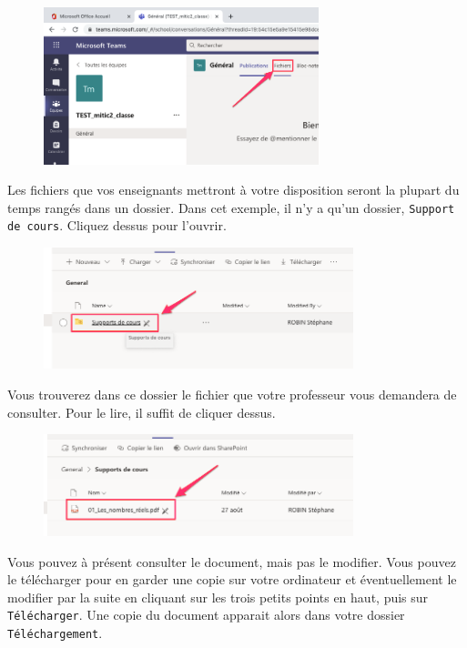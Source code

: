 \begin{figure}[H]
	\includegraphics[width=8cm]{./images/teams/accueil_classe_crop}
	\centering
\end{figure}

Les fichiers que vos enseignants mettront à votre disposition seront la plupart du temps rangés dans un dossier. Dans cet exemple, il n'y a qu'un dossier, \texttt{Support de cours}. Cliquez dessus pour l'ouvrir.

\begin{figure}[H]
	\includegraphics[width=9cm]{./images/teams/ouvrir_dossier_crop}
	\centering
\end{figure}

Vous trouverez dans ce dossier le fichier que votre professeur vous demandera de consulter. Pour le lire, il suffit de cliquer dessus.

\begin{figure}[H]
	\includegraphics[width=9cm]{./images/teams/ouvrir_fichier_crop}
	\centering
\end{figure}

Vous pouvez à présent consulter le document, mais pas le modifier. Vous pouvez le télécharger pour en garder une copie sur votre ordinateur et éventuellement le modifier par la suite en cliquant sur les trois petits points en haut, puis sur \texttt{Télécharger}. Une copie du document apparait alors dans votre dossier \texttt{Téléchargement}.\\

